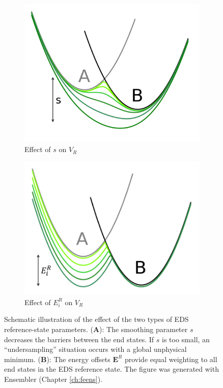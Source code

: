 \begin{figure}[h]
    \begin{center}
    \begin{subfigure}{0.44\columnwidth}
        \centering
        \includegraphics[width=\textwidth]{fig/intro/EDS_parmeters_s.png}
        \caption{Effect of $s$ on $V_R$}
        \label{fig: EDS_potential_behavioura}
    \end{subfigure}
    \begin{subfigure}{0.44\columnwidth}
        \centering
        \includegraphics[width=\textwidth]{fig/intro/EDS_parmeters_Eoff.png}
        \caption{Effect of $E_i^R$ on $V_R$}
        \label{fig: EDS_potential_behaviourb}
    \end{subfigure}
    \end{center}
    \caption{Schematic illustration of the effect of the two types of EDS reference-state parameters. (\textbf{A}): The smoothing parameter $s$ decreases the barriers between the end states. If $s$ is too small, an ``undersampling'' situation occurs with a global unphysical minimum. (\textbf{B}): The energy offsets $\textbf{E}^R$ provide equal weighting to all end states in the EDS reference state.  The figure was generated with Ensembler\cite{Ries2021A} (Chapter \ref{ch:feens}).}
    \label{fig: EDS_potential_behaviour}
\end{figure}

